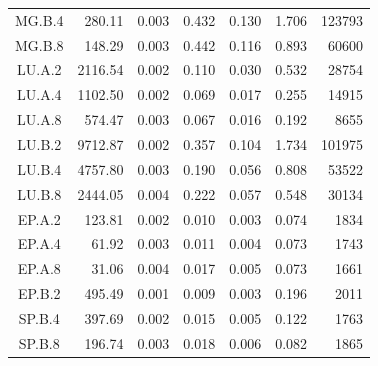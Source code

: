 \begin{ThreePartTable}
\begin{longtable}[c]{c*{6}{r}}
    MG.B.4                 & 280.11                              & 0.003                               & 0.432          & 0.130 & 1.706 & 123793 \\
    MG.B.8                 & 148.29                              & 0.003                               & 0.442          & 0.116 & 0.893 & 60600  \\
    LU.A.2                 & 2116.54                             & 0.002                               & 0.110          & 0.030 & 0.532 & 28754  \\
    LU.A.4                 & 1102.50                             & 0.002                               & 0.069          & 0.017 & 0.255 & 14915  \\
    LU.A.8                 & 574.47                              & 0.003                               & 0.067          & 0.016 & 0.192 & 8655   \\
    LU.B.2                 & 9712.87                             & 0.002                               & 0.357          & 0.104 & 1.734 & 101975 \\
    LU.B.4                 & 4757.80                             & 0.003                               & 0.190          & 0.056 & 0.808 & 53522  \\
    LU.B.8                 & 2444.05                             & 0.004                               & 0.222          & 0.057 & 0.548 & 30134  \\
    EP.A.2                 & 123.81                              & 0.002                               & 0.010          & 0.003 & 0.074 & 1834   \\
    EP.A.4                 & 61.92                               & 0.003                               & 0.011          & 0.004 & 0.073 & 1743   \\
    EP.A.8                 & 31.06                               & 0.004                               & 0.017          & 0.005 & 0.073 & 1661   \\
    EP.B.2                 & 495.49                              & 0.001                               & 0.009          & 0.003 & 0.196 & 2011   \\
    SP.B.4                 & 397.69                              & 0.002                               & 0.015          & 0.005 & 0.122 & 1763   \\
    SP.B.8                 & 196.74                              & 0.003                               & 0.018          & 0.006 & 0.082 & 1865   \\

\end{longtable}
\end{ThreePartTable}
